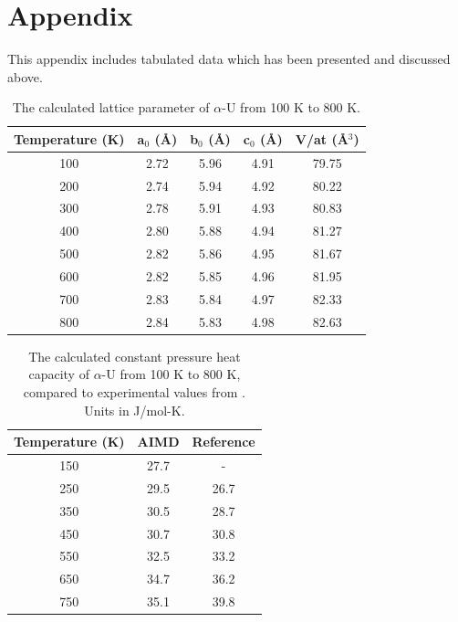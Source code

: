 \documentclass[utf8]{frontiersSCNS} %
\begin{document}
\section{Appendix}

This appendix includes tabulated data which has been presented and discussed above. 

\setcounter{table}{0}
\renewcommand{\thetable}{A\arabic{table}}

\begin{table}[h]
\caption{The calculated lattice parameter of $\alpha$-U from 100 K to 800 K.} \label{tab:lat}
\begin{center}
\begin{tabular}{|c|c|c|c|c|}
	\hline
	Temperature (K) & a$_0$ (\AA) & b$_0$ (\AA) & c$_0$ (\AA) & V/at (\AA$^3$) \\
	 \hline
100 &	2.72	& 5.96	& 4.91 &	79.75 \\
200 &	2.74 &	5.94 &	4.92 &	80.22  \\
300 &	2.78	& 5.91 &	4.93	& 80.83 \\
400 &	2.80 &	5.88 &	4.94	& 81.27 \\
500 &	2.82 &	5.86 &	4.95	& 81.67 \\
600 &	2.82 &	5.85 &	4.96	& 81.95 \\
700 &	2.83 &	5.84 &	4.97	 & 82.33 \\
800 &	2.84 &	5.83 &	4.98	& 82.63 \\
	 \hline
\end{tabular}
\end{center}
\label{default}
\end{table}

\begin{table}[h]
\caption{The calculated constant pressure heat capacity of $\alpha$-U from 100 K to 800 K, compared to experimental values from \cite{konings2010}. Units in J/mol-K.} \label{tab:cp}
\begin{center}
\begin{tabular}{|c|c|c|}
	\hline
	Temperature (K) & AIMD & Reference \\
	 \hline
150 &	27.7	& -	 \\
250 &	29.5 & 26.7  \\
350 &	30.5	& 28.7 \\
450 &	30.7 & 30.8  \\
550 &	32.5 & 33.2  \\
650 &	34.7 & 36.2  \\
750 &	35.1 & 39.8  \\
	 \hline
\end{tabular}
\end{center}
\label{default}
\end{table}
\end{document}
